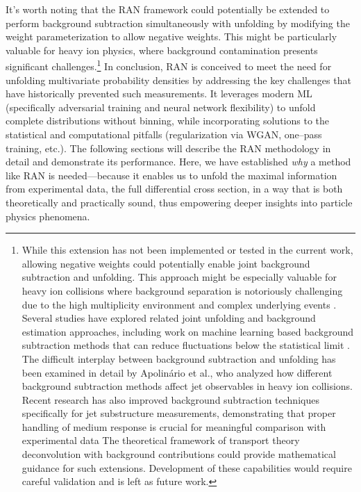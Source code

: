         It's worth noting that the RAN framework could potentially be extended to perform background subtraction simultaneously with unfolding by modifying the weight parameterization to allow negative weights.
        This might be particularly valuable for heavy ion physics, where background contamination presents significant challenges.\footnote{
            While this extension has not been implemented or tested in the current work, allowing negative weights could potentially enable joint background subtraction and unfolding.
            This approach might be especially valuable for heavy ion collisions where background separation is notoriously challenging due to the high multiplicity environment and complex underlying events .
            Several studies have explored related joint unfolding and background estimation approaches, including work on machine learning based background subtraction methods that can reduce fluctuations below the statistical limit .
            The difficult interplay between background subtraction and unfolding has been examined in detail by Apolinário et al., who analyzed how different background subtraction methods affect jet observables in heavy ion collisions.
            Recent research has also improved background subtraction techniques specifically for jet substructure measurements, demonstrating that proper handling of medium response is crucial for meaningful comparison with experimental data
            The theoretical framework of transport theory deconvolution with background contributions  could provide mathematical guidance for such extensions.
            Development of these capabilities would require careful validation and is left as future work.
        }
        In conclusion, RAN is conceived to meet the need for unfolding multivariate probability densities by addressing the key challenges that have historically prevented such measurements.
        It leverages modern ML (specifically adversarial training and neural network flexibility) to unfold complete distributions without binning, while incorporating solutions to the statistical and computational pitfalls (regularization via WGAN, one--pass training, etc.).
        The following sections will describe the RAN methodology in detail and demonstrate its performance.
        Here, we have established \emph{why} a method like RAN is needed---because it enables us to unfold the maximal information from experimental data, the full differential cross section, in a way that is both theoretically and practically sound, thus empowering deeper insights into particle physics phenomena.


